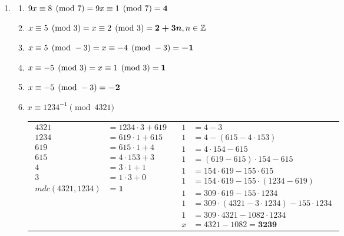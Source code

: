 \documentclass[fleqn]{article}
\begin{document}
\begin{enumerate}[label=\textbf{\arabic*})]
\begin{enumerate}
\end{enumerate}

\item

\begin{enumerate}

\item $9x \equiv 8 \pmod{7} \\
= 9x \equiv 1 \pmod{7} \\
= \boldsymbol{4}$

\item $x \equiv 5 \pmod{3} \\
= x \equiv 2 \pmod{3} \\
= \boldsymbol{2 + 3n}, n \in \mathbb{Z}$

\item $x \equiv 5 \pmod{-3} \\
= x \equiv -4 \pmod{-3} \\
= \boldsymbol{-1}$

\item $x \equiv -5 \pmod{3} \\
= x \equiv 1 \pmod{3} \\
= \boldsymbol{1}$

\item $x \equiv -5 \pmod{-3} \\
= \boldsymbol{-2}$

\item $x \equiv 1234^{-1} \pmod{4321}$

\begin{tabular}{*{2}{c}}
$\begin{aligned}
4321 &= 1234 \cdot 3 + 619 \\
1234 &= 619 \cdot 1 + 615 \\
619 &= 615 \cdot 1 + 4 \\
615 &= 4 \cdot 153 + 3 \\
4 &= 3 \cdot 1 + 1 \\
3 &= 1 \cdot 3 + 0 \\
mdc(4321, 1234) &= \boldsymbol{1}
\end{aligned}$ &
$\begin{aligned}
1 &= 4 - 3 \\
1 &= 4 - (615 - 4 \cdot 153) \\
1 &= 4 \cdot 154 - 615 \\
1 &= (619 - 615) \cdot 154 - 615 \\
1 &= 154 \cdot 619 - 155 \cdot 615 \\
1 &= 154 \cdot 619 - 155 \cdot (1234 - 619) \\
1 &= 309 \cdot 619 - 155 \cdot 1234 \\
1 &= 309 \cdot (4321 - 3 \cdot 1234) - 155 \cdot 1234 \\
1 &= 309 \cdot 4321 - 1082 \cdot 1234 \\
x &= 4321 - 1082 = \boldsymbol{3239}
\end{aligned}$
\end{tabular}


\end{enumerate}
\end{enumerate}
\end{document}
